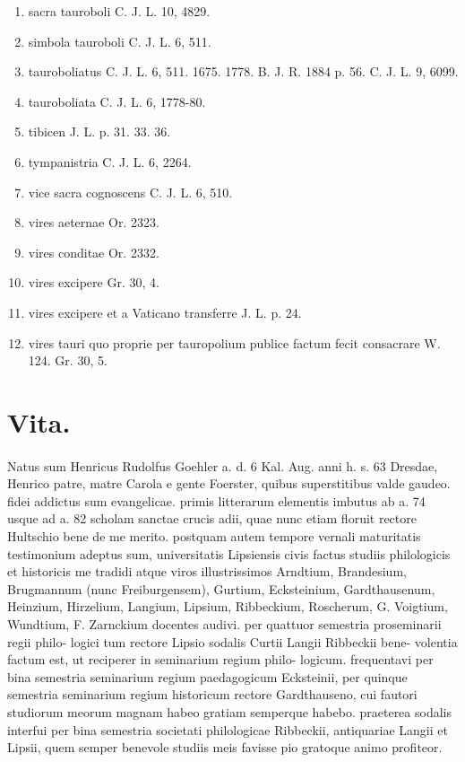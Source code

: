 \documentclass[a4paper, 11pt, oneside, polutonikogreek, german, twocolumn]{article}
\begin{document}
\begin{enumerate}
\item sacra tauroboli C. J. L. 10, 4829.

\item simbola tauroboli C. J. L. 6, 511.

\item tauroboliatus C. J. L. 6, 511. 1675. 1778. B. J. R. 1884 p. 56. C. J. L. 9, 6099.

\item tauroboliata C. J. L. 6, 1778-80.

\item tibicen J. L. p. 31. 33. 36.

\item tympanistria C. J. L. 6, 2264.

\item vice sacra cognoscens C. J. L. 6, 510.

\item vires aeternae Or. 2323.

\item vires conditae Or. 2332.

\item vires excipere Gr. 30, 4.

\item vires excipere et a Vaticano transferre J. L. p. 24.

\item vires tauri quo proprie per tauropolium publice factum fecit consacrare W. 124. Gr. 30, 5.
\end{enumerate}
\clearpage
\section{Vita.}
\paragraph{}
Natus sum Henricus Rudolfus Goehler a. d. 6 Kal. Aug. anni h. s. 63 Dresdae, Henrico patre, matre Carola e gente Foerster, quibus superstitibus valde gaudeo. fidei addictus sum evangelicae. primis litterarum elementis imbutus ab a. 74 usque ad a. 82 scholam sanctae crucis adii, quae nunc etiam floruit rectore Hultschio bene de me merito. postquam autem tempore vernali maturitatis testimonium adeptus sum, universitatis Lipsiensis civis factus studiis philologicis et historicis me tradidi atque viros illustrissimos Arndtium, Brandesium, Brugmannum (nunc Freiburgensem), Gurtium, Ecksteinium, Gardthausenum, Heinzium, Hirzelium, Langium, Lipsium, Ribbeckium, Roscherum, G. Voigtium, Wundtium, F. Zarnckium docentes audivi. per quattuor semestria proseminarii regii philo- logici tum rectore Lipsio sodalis Curtii Langii Ribbeckii bene- volentia factum est, ut reciperer in seminarium regium philo- logicum. frequentavi per bina semestria seminarium regium paedagogicum Ecksteinii, per quinque semestria seminarium regium historicum rectore Gardthauseno, cui fautori studiorum meorum magnam habeo gratiam semperque habebo. praeterea sodalis interfui per bina semestria societati philologicae Ribbeckii, antiquariae Langii et Lipsii, quem semper benevole studiis meis favisse pio gratoque animo profiteor.
\clearpage
\end{document}
